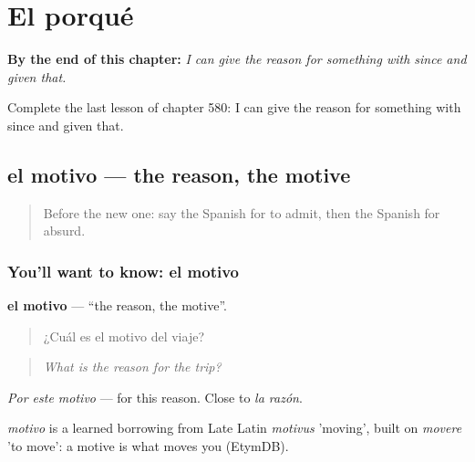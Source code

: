 
\chapter{El porqué}
\label{ch:es-el-porque}

\begin{chapteropening}
\textbf{By the end of this chapter:} \emph{I can give the reason for something with since and given that.}

Complete the last lesson of chapter 580: I can give the reason for something with since and given that.
\end{chapteropening}

\section[el motivo]{el motivo — the reason, the motive}

\label{lesson:ES-C580-motivo}



\begin{quote}
Before the new one: say the Spanish for to admit, then the Spanish for absurd.
\end{quote}

\subsection*{You'll want to know: el motivo}
\textbf{el motivo} — \textquotedblleft{}the reason, the motive\textquotedblright{}.

\begin{quote}
¿Cuál es el motivo del viaje?
\end{quote}

\begin{quote}
\emph{What is the reason for the trip?}
\end{quote}

\emph{Por este motivo} — for this reason. Close to \emph{la razón}.

\begin{cousinweb}
\emph{motivo} is a learned borrowing from Late Latin \emph{motivus} 'moving', built on \emph{movere} 'to move': a motive is what moves you (EtymDB).
\end{cousinweb}

